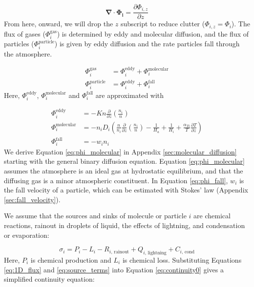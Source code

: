 \documentclass{article}
\begin{document}
\begin{equation} \label{eq:1D_flux}
  \bm{\nabla} \cdot \bm{\Phi_{i}} = \frac{\partial \Phi_{i,z}}{\partial z}
\end{equation}
From here, onward, we will drop the $z$ subscript to reduce clutter ($\Phi_{i,z} = \Phi_{i}$). The flux of gases ($\Phi_{i}^\text{gas}$) is determined by eddy and molecular diffusion, and the flux of particles ($\Phi_{i}^\text{particle}$) is given by eddy diffusion and the rate particles fall through the atmosphere.

\begin{align}
  \Phi_{i}^\text{gas} &= \Phi_{i}^\mathrm{eddy} + \Phi_{i}^\mathrm{molecular} \label{eq:phi_gas} \\
  \Phi_{i}^\text{particle} &= \Phi_{i}^\mathrm{eddy} + \Phi_{i}^\mathrm{fall} \label{eq:phi_particle}
\end{align}
Here, $\Phi_{i}^\mathrm{eddy}$, $\Phi_{i}^\mathrm{molecular}$ and $\Phi_{i}^\mathrm{fall}$ are approximated with

\begin{align}
  \Phi_{i}^\mathrm{eddy} &= - Kn\frac{\partial}{\partial z}\left( \frac{n_{i}}{n} \right) \label{eq:phi_eddy}\\ 
  \Phi_i^\text{molecular} &= -n_i D_{i} \left( \frac{n}{n_i} \frac{\partial}{\partial z} \left(\frac{n_i}{n}\right) - \frac{1}{H_a} + \frac{1}{H_i} + \frac{\alpha_{Ti}}{T} \frac{\partial T}{\partial z} \right) \label{eq:phi_molecular} \\
  \Phi_{i}^\mathrm{fall} &= - w_i n_i \label{eq:phi_fall}
\end{align}
We derive Equation \eqref{eq:phi_molecular} in Appendix \ref{sec:molecular_diffusion} starting with the general binary diffusion equation. Equation \eqref{eq:phi_molecular} assumes the atmosphere is an ideal gas at hydrostatic equilibrium, and that the diffusing gas is a minor atmospheric constituent. In Equation \eqref{eq:phi_fall}, $w_i$ is the fall velocity of a particle, which can be estimated with Stokes' law (Appendix \ref{sec:fall_velocity}).

We assume that the sources and sinks of molecule or particle $i$ are chemical reactions, rainout in droplets of liquid, the effects of lightning, and condensation or evaporation:

\begin{equation} \label{eq:source_terms}
  \sigma_i = P_{i} - L_{i} - R_{i\text{, rainout}} + Q_{i\text{, lightning}} + C_{i\text{, cond}}
\end{equation}
Here, $P_{i}$ is chemical production and $L_i$ is chemical loss. Substituting Equations \eqref{eq:1D_flux} and \eqref{eq:source_terms} into Equation \eqref{eq:continuity0} gives a simplified continuity equation:
\end{document}

